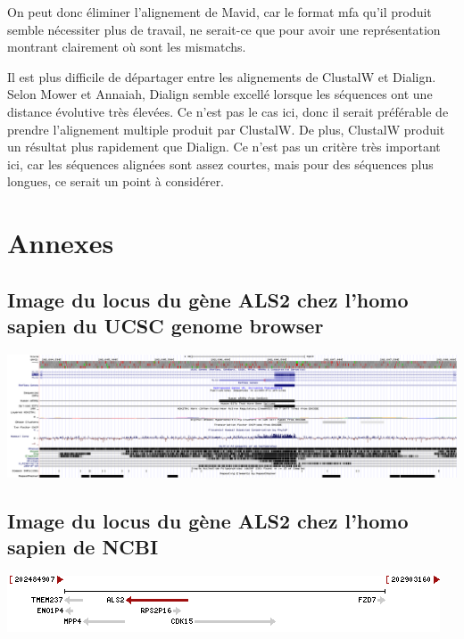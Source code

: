 \documentclass[10.8pt]{article} %
\renewcommand{\thesubsection}{\alph{subsection}}
\begin{document}
On peut donc éliminer l'alignement de Mavid, car le format mfa qu'il produit semble nécessiter plus de
travail, ne serait-ce que pour avoir une représentation montrant clairement où sont les mismatchs.

Il est plus difficile de départager entre les alignements de ClustalW et Dialign. Selon Mower et Annaiah, 
Dialign semble excellé lorsque les séquences ont une distance évolutive très élevées. Ce n'est pas le cas
ici, donc il serait préférable de prendre l'alignement multiple produit par ClustalW. De plus, ClustalW
produit un résultat plus rapidement que Dialign. Ce n'est pas un critère très important ici, car
les séquences alignées sont assez courtes, mais pour des séquences plus longues, ce serait un
point à considérer.

\begingroup
\renewcommand{\appendix}{%
    \renewcommand{\thesubsection}{\arabic{subsection}}
}

\newpage
\appendix
\section{Annexes}
\subsection{Image du locus du gène ALS2 chez l'homo sapien du UCSC genome browser}\label{1}
\includegraphics[width=\linewidth]{annexes/annexe1_ucsc.png}

\subsection{Image du locus du gène ALS2 chez l'homo sapien de NCBI}\label{2}
\includegraphics{annexes/annexe1_ncbi_als2.png}
\end{document}
